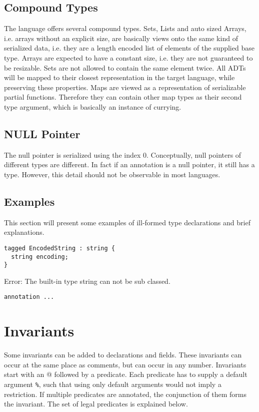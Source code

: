 \documentclass[a4paper,10pt]{article}
\begin{document}
\subsection*{Compound Types}

The language offers several compound types. Sets, Lists and auto sized Arrays, i.e. arrays without an explicit size, are basically views onto the same kind of serialized data, i.e. they are a length encoded list of elements of the supplied base type. Arrays are expected to have a constant size, i.e. they are not guaranteed to be resizable. Sets are not allowed to contain the same element twice.
All ADTs will be mapped to their closest representation in the target language, while preserving these properties.
Maps are viewed as a representation of serializable partial functions. Therefore they can contain other map types as their second type argument, which is basically an instance of currying.

\subsection*{NULL Pointer}

The null pointer is serialized using the index 0. Conceptually, null pointers of different types are different. In fact if an annotation is a null pointer, it still has a type. However, this detail should not be observable in most languages.


\subsection{Examples}

This section will present some examples of ill-formed type declarations and brief explanations.

\begin{verbatim}
tagged EncodedString : string {
  string encoding;
}
\end{verbatim}
Error: The built-in type string can not be sub classed.

\begin{verbatim}
annotation ...
\end{verbatim}


\section{Invariants}
Some invariants can be added to declarations and fields. These invariants can occur at the same place as comments, but can occur in any number. Invariants start with an \textsc{@} followed by a predicate. Each predicate has to supply a default argument \texttt{\%}, such that using only default arguments would not imply a restriction.
If multiple predicates are annotated, the conjunction of them forms the invariant.
The set of legal predicates is explained below.
\end{document}
